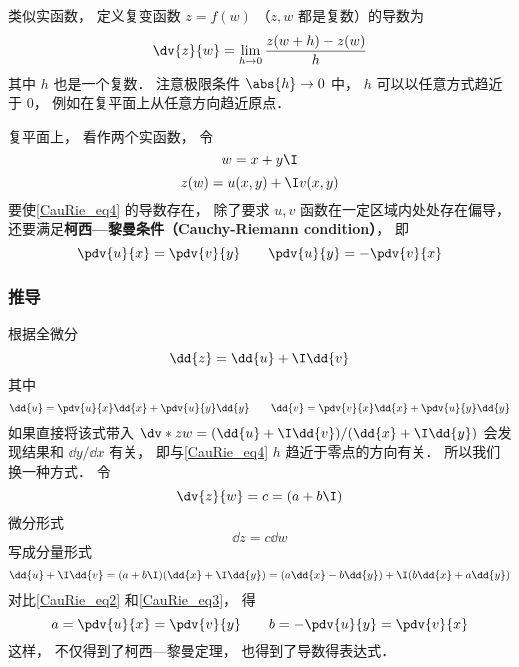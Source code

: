 
类似实函数， 定义复变函数 $z = f(w)$ （$z, w$ 都是复数）的导数为
\begin{equation}\label{CauRie_eq4}
\dv{z}{w} = \lim_{h\to 0} \frac{z(w + h) - z(w)}{h}
\end{equation}
其中 $h$ 也是一个复数． 注意极限条件 $\abs{h}\to 0$ 中， $h$ 可以以任意方式趋近于 $0$， 例如在复平面上从任意方向趋近原点．

复平面上， 看作两个实函数， 令
\begin{equation}
w = x + y\I
\end{equation}
\begin{equation}
z(w) = u(x, y) + \I v(x, y)
\end{equation}
要使\autoref{CauRie_eq4} 的导数存在， 除了要求 $u, v$ 函数在一定区域内处处存在偏导， 还要满足\textbf{柯西—黎曼条件（Cauchy-Riemann condition）}， 即
\begin{equation}\label{CauRie_eq1}
\pdv{u}{x} = \pdv{v}{y} \qquad
\pdv{u}{y} = - \pdv{v}{x}
\end{equation}

\subsubsection{推导}
根据全微分
\begin{equation}\label{CauRie_eq2}
\dd{z} = \dd{u} + \I \dd{v}
\end{equation}
其中
\begin{equation}\label{CauRie_eq3}
\dd{u} = \pdv{u}{x} \dd{x} + \pdv{u}{y} \dd{y} \qquad
\dd{v} = \pdv{v}{x} \dd{x} + \pdv{u}{y} \dd{y}
\end{equation}
如果直接将该式带入 $\dv*{z}{w} = (\dd{u} + \I \dd{v})/(\dd{x} + \I \dd{y})$ 会发现结果和 $\dd{y}/\dd{x}$ 有关， 即与\autoref{CauRie_eq4} $h$ 趋近于零点的方向有关． 所以我们换一种方式． 令
\begin{equation}
\dv{z}{w} = c = (a + b\I)
\end{equation}
微分形式
\begin{equation}
\dd{z} = c\dd{w}
\end{equation}
写成分量形式
\begin{equation}
\dd{u} + \I \dd{v} = (a + b\I)(\dd{x} + \I\dd{y}) = (a \dd{x} - b\dd{y}) + \I (b \dd{x} + a\dd{y})
\end{equation}
对比\autoref{CauRie_eq2} 和\autoref{CauRie_eq3}， 得
\begin{equation}
a = \pdv{u}{x} = \pdv{v}{y} \qquad
b = -\pdv{u}{y} = \pdv{v}{x}
\end{equation}
这样， 不仅得到了柯西—黎曼定理， 也得到了导数得表达式．

